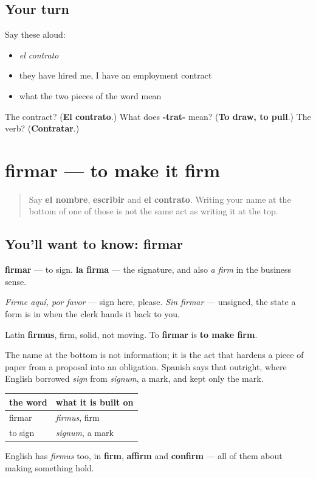 \subsection*{Your turn}
Say these aloud:

\begin{itemize}
\raggedright
  \item \emph{el contrato}
  \item they have hired me, I have an employment contract
  \item what the two pieces of the word mean
\end{itemize}

\begin{tcolorbox}[breakable,colback=teal!4,colframe=teal!35!black,title={Before you move on}]
The contract? (\textbf{El contrato}.) What does \textbf{-trat-} mean? (\textbf{To draw, to pull}.) The verb? (\textbf{Contratar}.)
\end{tcolorbox}
\section[firmar]{firmar — to make it firm}

\label{lesson:ES-C441-firmar}



\begin{quote}
Say \textbf{el nombre}, \textbf{escribir} and \textbf{el contrato}. Writing your name at the bottom of one of those is not the same act as writing it at the top.
\end{quote}

\subsection*{You'll want to know: firmar}
\textbf{firmar} — to sign. \textbf{la firma} — the signature, and also \emph{a firm} in the business sense.

\emph{Firme aquí, por favor} — sign here, please. \emph{Sin firmar} — unsigned, the state a form is in when the clerk hands it back to you.

\begin{cousinweb}
Latin \textbf{firmus}, firm, solid, not moving. To \textbf{firmar} is \textbf{to make firm}.

The name at the bottom is not information; it is the act that hardens a piece of paper from a proposal into an obligation. Spanish says that outright, where English borrowed \emph{sign} from \emph{signum}, a mark, and kept only the mark.

\noindent
\begin{tabularx}{\linewidth}{@{}>{\raggedright\arraybackslash}X>{\raggedright\arraybackslash}X@{}}
\toprule
\textbf{the word} & \textbf{what it is built on} \\
\midrule
firmar & \emph{firmus}, firm \\
to sign & \emph{signum}, a mark \\
\bottomrule
\end{tabularx}

English has \emph{firmus} too, in \textbf{firm}, \textbf{affirm} and \textbf{confirm} — all of them about making something hold.
\end{cousinweb}

